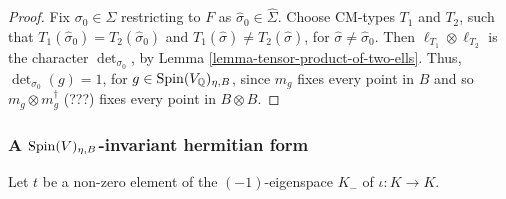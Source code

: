 \documentclass[12pt]{amsart}
\newcommand{\hide}[1]{}
\numberwithin{equation}{subsection}
\theoremstyle{plain}
\newtheorem{lem}[thm]{Lemma}
\theoremstyle{definition}
\newcommand{\QQ}{{\mathbb Q}}
\newcommand{\Spin}{{\rm Spin}}
\begin{document}
{\begin{proof}
Fix $\sigma_0\in\Sigma$ restricting to $F$ as $\hat{\sigma}_0\in\hat{\Sigma}$. 
Choose CM-types $T_1$ and $T_2$, such that $T_1(\hat{\sigma}_0)=T_2(\hat{\sigma}_0)$ and $T_1(\hat{\sigma})\neq T_2(\hat{\sigma})$, for $\hat{\sigma}\neq\hat{\sigma}_0$. 
Then $\ell_{T_1}\otimes\ell_{T_2}$ is the character $\det_{\sigma_0}$, by Lemma \ref{lemma-tensor-product-of-two-ells}. Thus, $\det_{\sigma_0}(g)=1$, for $g\in \Spin(V_\QQ)_{\eta,B}$, 
since $m_g$ fixes every point in $B$ and so $m_g\otimes m^\dagger_g$ (???) fixes every point in $B\otimes B$.
\end{proof}





%
\subsubsection{A $\Spin(V)_{\eta,B}$-invariant hermitian form}
Let $t$ be a non-zero element of the $(-1)$-eigenspace $K_-$ of $\iota:K\rightarrow K$. 
\hide{
Choose a CM-type $T$. 
Consider the $F\otimes_\QQ\tilde{K}$-valued form $H_{t,T}:V_\QQ\times V_\QQ\rightarrow F\otimes_\QQ\tilde{K}\cong \prod_{\hat{\sigma}\in\hat{\Sigma}}\tilde{K}$ whose $\hat{\sigma}$ component is given by
\[
H_{t,T}(x_{\hat{\sigma}},y_{\hat{\sigma}}):= \hat{\sigma}(t\iota(t))(x_{\hat{\sigma}},y_{\hat{\sigma}})_V+\sigma(t)((\eta(t)x)_{\hat{\sigma}},y_{\hat{\sigma}})_V,
\]
where $\sigma=T(\hat{\sigma}):K\rightarrow \tilde{K}$, 
$x=\sum_{\hat{\sigma}\in\hat{\Sigma}}x_{\hat{\sigma}}$ with $x_{\hat{\sigma}}\in V_{\hat{\sigma}}$, and $y_{\hat{\sigma}}$ is defined similarly.
We have $H_{t,T}(x,y)=\iota(H_{t,T}(y,x))$, by Corollary \ref{cor-Neron-Severi-group}. 

\begin{lem}
The form $H_{t,T}$ is hermitian,  i.e., 
\begin{equation}
\label{eq-K-linearity-in-second-variable}
H_{t,T}(x_{\hat{\sigma}},\eta(\lambda)y_{\hat{\sigma}})=\sigma(\lambda)H_{t,T}(x_{\hat{\sigma}},y_{\hat{\sigma}}), 
\end{equation}
for $\lambda\in K$, where $\sigma=T(\hat{\sigma})$. Furthermore, $H_{t,T}$ is $\Spin(V_\QQ)_{\eta,B}$-invariant.
\end{lem}

}}
\end{document}

